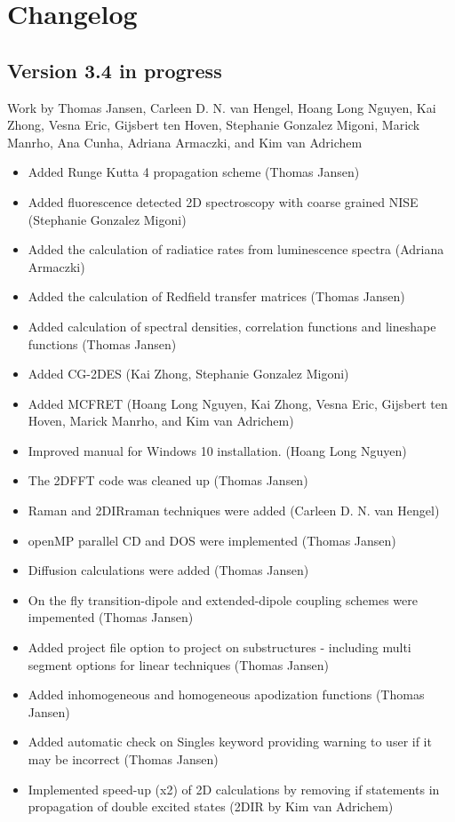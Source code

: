 \section{Changelog}
\subsection{Version 3.4 in progress}
{\small Work by Thomas Jansen, Carleen D. N. van Hengel, Hoang Long Nguyen, Kai Zhong, Vesna Eric, Gijsbert ten Hoven,
Stephanie Gonzalez Migoni, Marick Manrho, Ana Cunha, Adriana Armaczki, and Kim van Adrichem}
\begin{itemize}
\item Added Runge Kutta 4 propagation scheme (Thomas Jansen)
\item Added fluorescence detected 2D spectroscopy with coarse grained NISE (Stephanie Gonzalez Migoni)
\item Added the calculation of radiatice rates from luminescence spectra (Adriana Armaczki)
\item Added the calculation of Redfield transfer matrices (Thomas Jansen)
\item Added calculation of spectral densities, correlation functions and lineshape functions (Thomas Jansen)
\item Added CG-2DES (Kai Zhong, Stephanie Gonzalez Migoni)
\item Added MCFRET (Hoang Long Nguyen, Kai Zhong, Vesna Eric, Gijsbert ten Hoven, Marick Manrho, and Kim van Adrichem)
\item Improved manual for Windows 10 installation. (Hoang Long Nguyen)
\item The 2DFFT code was cleaned up (Thomas Jansen)
\item Raman and 2DIRraman techniques were added (Carleen D. N. van Hengel)
\item openMP parallel CD and DOS were implemented (Thomas Jansen)
\item Diffusion calculations were added (Thomas Jansen)
\item On the fly transition-dipole and extended-dipole coupling schemes were impemented (Thomas Jansen)
\item Added project file option to project on substructures - including multi segment options for linear techniques (Thomas Jansen)
\item Added inhomogeneous and homogeneous apodization functions (Thomas Jansen)
\item Added automatic check on Singles keyword providing warning to user if it may be incorrect (Thomas Jansen)
\item Implemented speed-up (x2) of 2D calculations by removing if statements in propagation of double excited states (2DIR by Kim van Adrichem)
\end{itemize}
